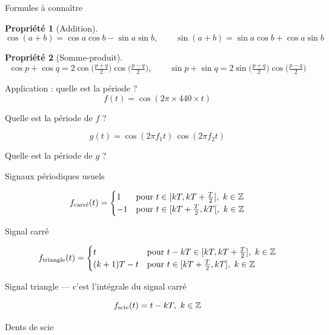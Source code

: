 \documentclass[aspectratio=43,10pt]{beamer}
\newtheorem{proposition}{Propriété}
\newcommand{\slidefig}[2]{%
\begin{center}
\resizebox{#1}{!}{}
\end{center}
}
\begin{document}
\begin{frame}{Formules à connaître}
    \begin{proposition}[Addition]
        \[
            \cos(a+b)=\cos a\cos b - \sin a\sin b, \qquad
            \sin(a+b)=\sin a\cos b + \cos a\sin b
        \]
    \end{proposition}
    \begin{proposition}[Somme-produit]
        \[
            \cos p+\cos q = 2\cos\!\Big(\tfrac{p+q}{2}\Big)\cos\!\Big(\tfrac{p-q}{2}\Big),
            \qquad
            \sin p+\sin q = 2\sin\!\Big(\tfrac{p+q}{2}\Big)\cos\!\Big(\tfrac{p-q}{2}\Big)
        \]
    \end{proposition}
\end{frame}

\begin{frame}{Application : quelle est la période ?}
    \[
        f(t) = \cos(2\pi \times 440 \times t)
    \]
    \begin{center}\small Quelle est la période de $f$ ?\end{center}
    \vspace{1.5em}
    \[
        g(t) = \cos(2\pi f_1 t)\,\cos(2\pi f_2 t)
    \]
    \begin{center}
        \small Quelle est la période de $g$ ?
    \end{center}
\end{frame}

\begin{frame}{Signaux périodiques usuels}
    \begin{overprint}
    $$
        f_{\rm carr\acute{e}}(t) = \begin{cases} 1 & \text{pour} \ t \in [kT,kT + \frac{T}{2}[, \ k\in{\mathbb{Z}}\\ -1 & \text{pour} \ t \in [kT + \frac{T}{2},kT[, \ k\in{\mathbb{Z}} \end{cases}
    $$
    \slidefig{0.6\textwidth}{signal-carre-slide.tex}
    \begin{center}\small Signal carré\end{center}
    $$
    f_{\rm triangle}(t) = \begin{cases} t & \text{pour} \ t - kT \in [kT,kT + \frac{T}{2}], \ k\in{\mathbb{Z}}\\ (k+1)T - t & \text{pour} \ t \in [kT + \frac{T}{2},kT], \ k\in{\mathbb{Z}} \end{cases}
    $$
    \slidefig{0.6\textwidth}{signal-triangle-slide.tex}
    \begin{center}\small Signal triangle --- c'est l'intégrale du signal carré\end{center}
    $$
    f_{\rm scie}(t) = t - kT ,\ k\in\Z
    $$
    \slidefig{0.6\textwidth}{signal-scie-slide.tex}
    \begin{center}\small Dents de scie\end{center}
    \end{overprint}
\end{frame}
\end{document}
